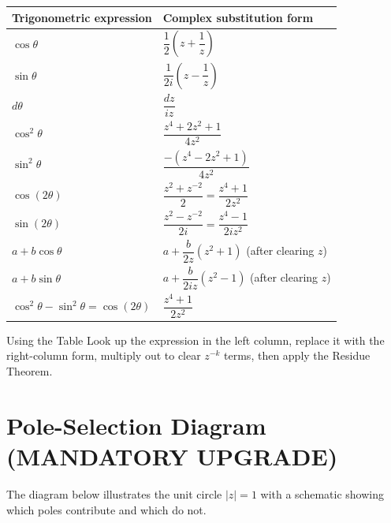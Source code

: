 \documentclass[12pt,a4paper]{article}
\begin{document}
\begin{center}
\begin{tabular}{@{}p{5.5cm}p{7cm}@{}}
\toprule
\textbf{Trigonometric expression} & \textbf{Complex substitution form} \\
\midrule
$\cos\theta$
  & $\dfrac{1}{2}\!\left(z + \dfrac{1}{z}\right)$ \\[8pt]
$\sin\theta$
  & $\dfrac{1}{2i}\!\left(z - \dfrac{1}{z}\right)$ \\[8pt]
$d\theta$
  & $\dfrac{dz}{iz}$ \\[8pt]
$\cos^2\theta$
  & $\dfrac{z^4 + 2z^2 + 1}{4z^2}$ \\[8pt]
$\sin^2\theta$
  & $\dfrac{-(z^4 - 2z^2 + 1)}{4z^2}$ \\[8pt]
$\cos(2\theta)$
  & $\dfrac{z^2 + z^{-2}}{2} = \dfrac{z^4+1}{2z^2}$ \\[8pt]
$\sin(2\theta)$
  & $\dfrac{z^2 - z^{-2}}{2i} = \dfrac{z^4-1}{2iz^2}$ \\[8pt]
$a + b\cos\theta$
  & $a + \dfrac{b}{2z}(z^2+1)$ (after clearing $z$) \\[8pt]
$a + b\sin\theta$
  & $a + \dfrac{b}{2iz}(z^2-1)$ (after clearing $z$) \\[8pt]
$\cos^2\theta - \sin^2\theta = \cos(2\theta)$
  & $\dfrac{z^4+1}{2z^2}$ \\[8pt]
\bottomrule
\end{tabular}
\end{center}

\begin{learnbox}{Using the Table}
Look up the expression in the left column, replace it with the right-column
form, multiply out to clear $z^{-k}$ terms, then apply the Residue Theorem.
\end{learnbox}

\section{Pole-Selection Diagram (MANDATORY UPGRADE)}

The diagram below illustrates the unit circle $|z|=1$ with a schematic showing
which poles contribute and which do not.
\end{document}
